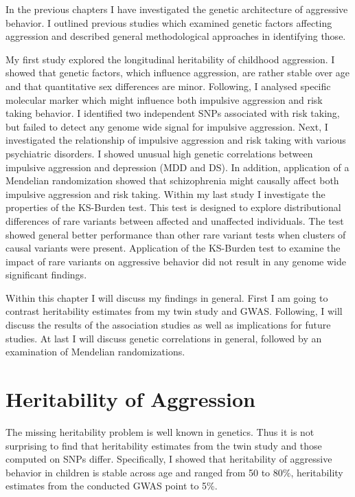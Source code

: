 
In the previous chapters I have investigated the genetic architecture of aggressive behavior.
I outlined previous studies which examined genetic factors affecting aggression and described general methodological approaches in identifying those.

My first study explored the longitudinal heritability of childhood aggression.
I showed that genetic factors, which influence aggression, are rather stable over age and that quantitative sex differences are minor.
Following, I analysed specific molecular marker which might influence both impulsive aggression and risk taking behavior.
I identified two independent SNPs associated with risk taking, but failed to detect any genome wide signal for impulsive aggression.
Next, I investigated the relationship of impulsive aggression and risk taking with various psychiatric disorders.
I showed unusual high genetic correlations between impulsive aggression and depression (MDD and DS).
In addition, application of a Mendelian randomization showed that schizophrenia might causally affect both impulsive aggression and risk taking.
Within my last study I investigate the properties of the KS-Burden test.
This test is designed to explore distributional differences of rare variants between affected and unaffected individuals.
The test showed general better performance than other rare variant tests when clusters of causal variants were present.
Application of the KS-Burden test to examine the impact of rare variants on aggressive behavior did not result in any genome wide significant findings.

Within this chapter I will discuss my findings in general.
First I am going to contrast heritability estimates from  my twin study and GWAS\@.
Following, I will discuss the results of the association studies as well as implications for future studies.
At last I will discuss genetic correlations in general, followed by an examination of Mendelian randomizations.

\section{Heritability of Aggression}
\label{sec:heritability_of_aggression}

The missing heritability problem is well known in genetics.
Thus it is not surprising to find that heritability estimates from the twin study and those computed on SNPs differ.
Specifically, I showed that heritability of aggressive behavior in children is stable across age and ranged from 50 to 80\%, heritability estimates from the conducted GWAS point to 5\%. 


